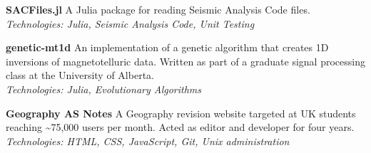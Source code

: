 %
\textbf{SACFiles.jl}  \newline
A Julia package for reading Seismic Analysis Code files. \\
\emph{Technologies: Julia, Seismic Analysis Code, Unit Testing}

\medskip
\textbf{genetic-mt1d}  \newline
An implementation of a genetic algorithm that creates 1D inversions of
magnetotelluric data. Written as part of a graduate signal processing class at
the University of Alberta. \\
\emph{Technologies: Julia, Evolutionary Algorithms}

\medskip
\textbf{Geography AS Notes}  \newline
A Geography revision website targeted at UK students reaching
\textasciitilde{}75,000 users per month. Acted as editor and developer for
four years. \\
\emph{Technologies: HTML, CSS, JavaScript, Git, Unix administration}

\bigskip


